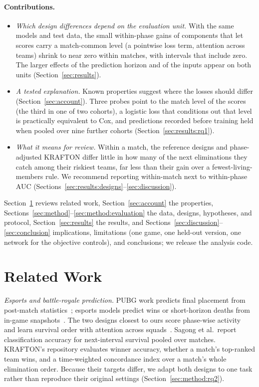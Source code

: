 \documentclass[sigconf,anonymous]{acmart}
\begin{document}
\paragraph{Contributions.}
\begin{itemize}
\item \emph{Which design differences depend on the evaluation unit.} With the same models and test data, the small within-phase gains of components that let scores carry a match-common level (a pointwise loss term, attention across teams) shrink to near zero within matches, with intervals that include zero. The larger effects of the prediction horizon and of the inputs appear on both units (Section~\ref{sec:results}).
\item \emph{A tested explanation.} Known properties suggest where the losses should differ (Section~\ref{sec:account}). Three probes point to the match level of the scores (the third in one of two cohorts), a logistic loss that conditions out that level is practically equivalent to Cox, and predictions recorded before training held when pooled over nine further cohorts (Section~\ref{sec:results:rq1}).
\item \emph{What it means for review.} Within a match, the reference designs and phase-adjusted KRAFTON differ little in how many of the next eliminations they catch among their riskiest teams, far less than their gain over a fewest-living-members rule. We recommend reporting within-match next to within-phase AUC (Sections~\ref{sec:results:designs}--\ref{sec:discussion}).
\end{itemize}
Section~\ref{sec:related} reviews related work, Section~\ref{sec:account} the properties, Sections~\ref{sec:method}--\ref{sec:method:evaluation} the data, designs, hypotheses, and protocol, Section~\ref{sec:results} the results, and Sections~\ref{sec:discussion}--\ref{sec:conclusion} implications, limitations (one game, one held-out version, one network for the objective controls), and conclusions; we release the analysis code.

\section{Related Work}
\label{sec:related}
\emph{Esports and battle-royale prediction.} PUBG work predicts final placement from post-match statistics~\cite{KagglePUBG,LeeLee25}; esports models predict wins or short-horizon deaths from in-game snapshots~\cite{Hodge21,Katona19,Marshall22}. The two designs closest to ours score phase-wise activity~\cite{Sagong25a} and learn survival order with attention across squads~\cite{KRAFTON}. Sagong et al.\ report classification accuracy for next-interval survival pooled over matches. KRAFTON's repository evaluates winner accuracy, whether a match's top-ranked team wins, and a time-weighted concordance index over a match's whole elimination order. Because their targets differ, we adapt both designs to one task rather than reproduce their original settings (Section~\ref{sec:method:rq2}).
\end{document}
